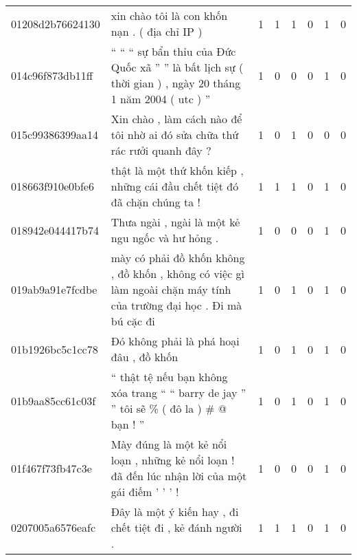 \begin{sidewaystable}[htb!]
\begin{tabularx}{\textwidth}{L{0.8} L{6.6} C{0.1} C{0.1} C{0.1} C{0.1} C{0.1} C{0.1}}
        01208d2b76624130 & xin chào tôi là con khốn nạn . ( địa chỉ IP )                                                                                     & 1           & 1           & 1           & 0           & 1           & 0           \\
        014c96f873db11ff & `` `` `` sự bẩn thỉu của Đức Quốc xã '' '' là bất lịch sự ( thời gian ) , ngày 20 tháng 1 năm 2004 ( utc ) ''                     & 1           & 0           & 0           & 0           & 1           & 0           \\
        015c99386399aa14 & Xin chào , làm cách nào để tôi nhờ ai đó sửa chữa thứ rác rưởi quanh đây ?                                                        & 1           & 0           & 1           & 0           & 0           & 0           \\
        018663f910e0bfe6 & thật là một thứ khốn kiếp , những cái đầu chết tiệt đó đã chặn chúng ta !                                                         & 1           & 1           & 1           & 0           & 1           & 0           \\
        018942e044417b74 & Thưa ngài , ngài là một kẻ ngu ngốc và hư hỏng .                                                                                  & 1           & 0           & 0           & 0           & 1           & 0           \\
        019ab9a91e7fcdbe & mày có phải đồ khốn không , đồ khốn , không có việc gì làm ngoài chặn máy tính của trường đại học . Đi mà bú cặc đi               & 1           & 0           & 1           & 0           & 1           & 0           \\
        01b1926bc5c1cc78 & Đó không phải là phá hoại đâu , đồ khốn                                                                                           & 1           & 0           & 1           & 0           & 1           & 0           \\
        01b9aa85cc61c03f & `` thật tệ nếu bạn không xóa trang `` `` barry de jay '' '' tôi sẽ \% ( đô la ) \# @ bạn ! ''                                     & 1           & 0           & 1           & 0           & 1           & 0           \\
        01f467f73fb47c3e & Mày đúng là một kẻ nổi loạn , những kẻ nổi loạn ! đã đến lúc nhận lời của một gái điếm ' ' ' !                                    & 1           & 0           & 0           & 0           & 1           & 0           \\
        0207005a6576eafc & Đây là một ý kiến hay , đi chết tiệt đi , kẻ đánh người .                                                                         & 1           & 1           & 1           & 0           & 1           & 0           \\

\end{tabularx}
\end{sidewaystable}
